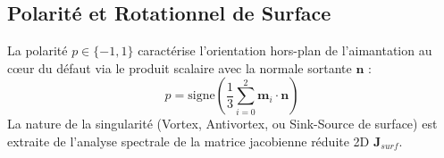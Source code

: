 \documentclass[11pt,a4paper]{article}
\begin{document}
\subsection{Polarité et Rotationnel de Surface}
La polarité $p \in \{-1, 1\}$ caractérise l'orientation hors-plan de l'aimantation au cœur du défaut via le produit scalaire avec la normale sortante $\mathbf{n}$ :
\begin{equation}
p = \text{signe}\left( \frac{1}{3} \sum_{i=0}^{2} \mathbf{m}_i \cdot \mathbf{n} \right)
\end{equation}
La nature de la singularité (Vortex, Antivortex, ou Sink-Source de surface) est extraite de l'analyse spectrale de la matrice jacobienne réduite 2D $\mathbf{J}_{surf}$.
\end{document}
